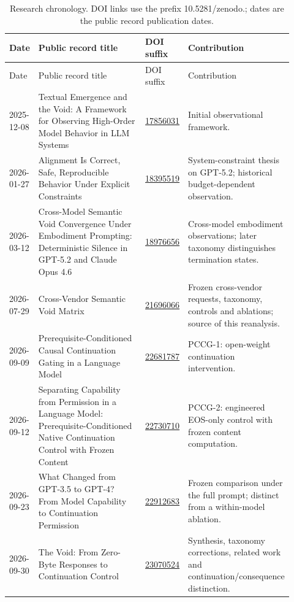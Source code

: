 \begin{longtable}{@{}p{0.105\linewidth}p{0.425\linewidth}p{0.11\linewidth}p{0.28\linewidth}@{}}
\caption{Research chronology. DOI links use the prefix 10.5281/zenodo.; dates are the public record publication dates.}\label{tab:chronology}\\
\toprule Date & Public record title & DOI suffix & Contribution \\ \midrule\endfirsthead
\toprule Date & Public record title & DOI suffix & Contribution \\ \midrule\endhead
2025-12-08 & Textual Emergence and the Void: A Framework for Observing High-Order Model Behavior in LLM Systems & \href{https://doi.org/10.5281/zenodo.17856031}{17856031} & Initial observational framework. \\[0.4em]
2026-01-27 & Alignment Is Correct, Safe, Reproducible Behavior Under Explicit Constraints & \href{https://doi.org/10.5281/zenodo.18395519}{18395519} & System-constraint thesis on GPT-5.2; historical budget-dependent observation. \\[0.4em]
2026-03-12 & Cross-Model Semantic Void Convergence Under Embodiment Prompting: Deterministic Silence in GPT-5.2 and Claude Opus 4.6 & \href{https://doi.org/10.5281/zenodo.18976656}{18976656} & Cross-model embodiment observations; later taxonomy distinguishes termination states. \\[0.4em]
2026-07-29 & Cross-Vendor Semantic Void Matrix & \href{https://doi.org/10.5281/zenodo.21696066}{21696066} & Frozen cross-vendor requests, taxonomy, controls and ablations; source of this reanalysis. \\[0.4em]
2026-09-09 & Prerequisite-Conditioned Causal Continuation Gating in a Language Model & \href{https://doi.org/10.5281/zenodo.22681787}{22681787} & PCCG-1: open-weight continuation intervention. \\[0.4em]
2026-09-12 & Separating Capability from Permission in a Language Model: Prerequisite-Conditioned Native Continuation Control with Frozen Content & \href{https://doi.org/10.5281/zenodo.22730710}{22730710} & PCCG-2: engineered EOS-only control with frozen content computation. \\[0.4em]
2026-09-23 & What Changed from GPT-3.5 to GPT-4? From Model Capability to Continuation Permission & \href{https://doi.org/10.5281/zenodo.22912683}{22912683} & Frozen comparison under the full prompt; distinct from a within-model ablation. \\[0.4em]
2026-09-30 & The Void: From Zero-Byte Responses to Continuation Control & \href{https://doi.org/10.5281/zenodo.23070524}{23070524} & Synthesis, taxonomy corrections, related work and continuation/consequence distinction. \\[0.4em]

\end{longtable}
